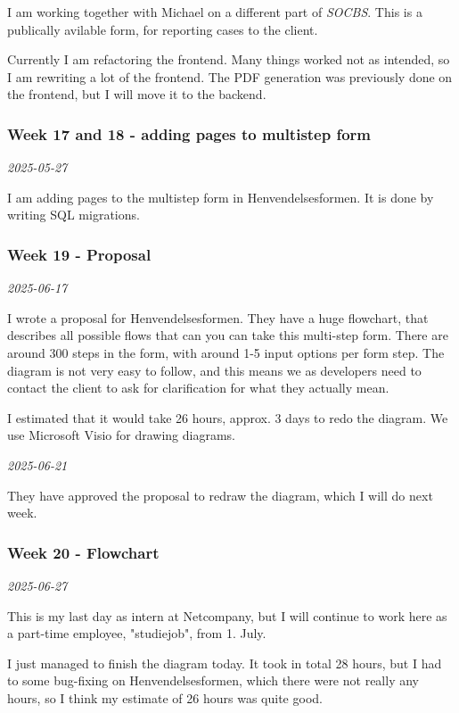 \documentclass[../main.tex]{subfiles}
\begin{document}
I am working together with Michael on a different part of \textit{SOCBS}. This is a publically avilable form, for reporting cases to the client. 

Currently I am refactoring the frontend. Many things worked not as intended, so I am rewriting a lot of the frontend. The PDF generation was previously done on the frontend, but I will move it to the backend.

\subsubsection{Week 17 and 18 - adding pages to multistep form}

\noindent \textit{2025-05-27}
\smallskip

I am adding pages to the multistep form in Henvendelsesformen. It is done by writing SQL migrations. 

\subsubsection{Week 19 - Proposal}

\noindent \textit{2025-06-17}
\smallskip

I wrote a proposal for Henvendelsesformen. They have a huge flowchart, that describes all possible flows that can you can take this multi-step form. There are around 300 steps in the form, with around 1-5 input options per form step. The diagram is not very easy to follow, and this means we as developers need to contact the client to ask for clarification for what they actually mean. 

I estimated that it would take 26 hours, approx. 3 days to redo the diagram. We use Microsoft Visio for drawing diagrams.


\bigskip
\noindent \textit{2025-06-21}
\smallskip

They have approved the proposal to redraw the diagram, which I will do next week.

\subsubsection{Week 20 - Flowchart}

\noindent \textit{2025-06-27}
\smallskip

This is my last day as intern at Netcompany, but I will continue to work here as a part-time employee, "studiejob", from 1. July. 

I just managed to finish the diagram today. It took in total 28 hours, but I had to some bug-fixing on Henvendelsesformen, which there were not really any hours, so I think my estimate of 26 hours was quite good. 
\end{document}
